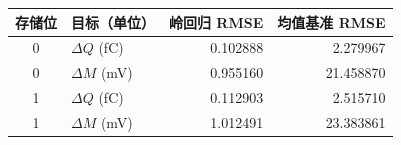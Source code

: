 \begin{tabular}{clrr}
\toprule
存储位 & 目标（单位） & 岭回归 RMSE & 均值基准 RMSE \\
\midrule
0 & $\Delta Q$ (fC) & 0.102888 & 2.279967 \\
0 & $\Delta M$ (mV) & 0.955160 & 21.458870 \\
1 & $\Delta Q$ (fC) & 0.112903 & 2.515710 \\
1 & $\Delta M$ (mV) & 1.012491 & 23.383861 \\
\bottomrule
\end{tabular}
